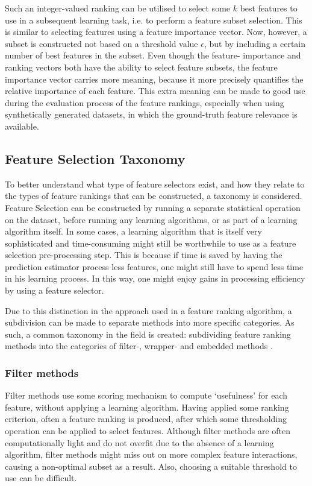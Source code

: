 \documentclass[../main.tex]{subfiles}
\begin{document}
Such an integer-valued ranking can be utilised to select some $k$ best features to use in a subsequent learning task, i.e. to perform a feature subset selection. This is similar to selecting features using a feature importance vector. Now, however, a subset is constructed not based on a threshold value $\epsilon$, but by including a certain number of best features in the subset. Even though the feature- importance and ranking vectors both have the ability to select feature subsets, the feature importance vector carries more meaning, because it more precisely quantifies the relative importance of each feature. This extra meaning can be made to good use during the evaluation process of the feature rankings, especially when using synthetically generated datasets, in which the ground-truth feature relevance is available.




\subsection{Feature Selection Taxonomy}
To better understand what type of feature selectors exist, and how they relate to the types of feature rankings that can be constructed, a taxonomy is considered. Feature Selection can be constructed by running a separate statistical operation on the dataset, before running any learning algorithms, or as part of a learning algorithm itself. In some cases, a learning algorithm that is itself very sophisticated and time-consuming might still be worthwhile to use as a feature selection pre-processing step. This is because if time is saved by having the prediction estimator process less features, one might still have to spend less time in his learning process. In this way, one might enjoy gains in processing efficiency by using a feature selector.

Due to this distinction in the approach used in a feature ranking algorithm, a subdivision can be made to separate methods into more specific categories. As such, a common taxonomy in the field is created: subdividing feature ranking methods into the categories of filter-, wrapper- and embedded methods \citep{chandrashekar_survey_2014}.



\subsubsection{Filter methods}
Filter methods use some scoring mechanism to compute \lq usefulness' for each feature, without applying a learning algorithm. Having applied some ranking criterion, often a feature ranking is produced, after which some thresholding operation can be applied to select features. Although filter methods are often computationally light and do not overfit due to the absence of a learning algorithm, filter methods might miss out on more complex feature interactions, causing a non-optimal subset as a result. Also, choosing a suitable threshold to use can be difficult.
\end{document}
